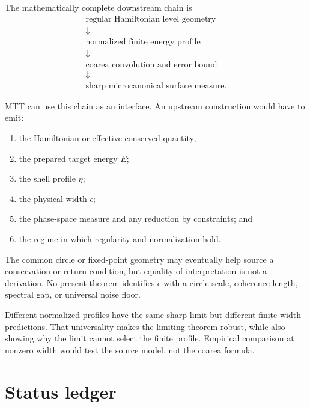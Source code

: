 \documentclass[11pt]{article}
\begin{document}
The mathematically complete downstream chain is
\[
\boxed{
\begin{gathered}
\text{regular Hamiltonian level geometry}\\
\downarrow\\
\text{normalized finite energy profile}\\
\downarrow\\
\text{coarea convolution and error bound}\\
\downarrow\\
\text{sharp microcanonical surface measure}.
\end{gathered}
}
\]

MTT can use this chain as an interface. An upstream construction would have to
emit:
\begin{enumerate}
\item the Hamiltonian or effective conserved quantity;
\item the prepared target energy \(E\);
\item the shell profile \(\eta\);
\item the physical width \(\epsilon\);
\item the phase-space measure and any reduction by constraints; and
\item the regime in which regularity and normalization hold.
\end{enumerate}

The common circle or fixed-point geometry may eventually help source a
conservation or return condition, but equality of interpretation is not a
derivation. No present theorem identifies \(\epsilon\) with a circle scale,
coherence length, spectral gap, or universal noise floor.

Different normalized profiles have the same sharp limit but different
finite-width predictions. That universality makes the limiting theorem robust,
while also showing why the limit cannot select the finite profile. Empirical
comparison at nonzero width would test the source model, not the coarea
formula.

\section{Status ledger}
\end{document}
